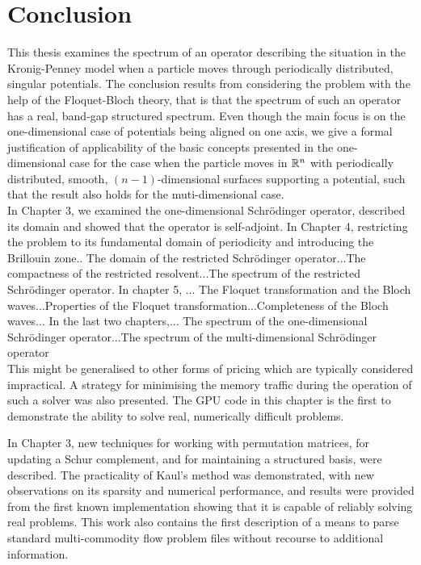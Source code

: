 \chapter{Conclusion} \label{chap:8}
	
This thesis examines the spectrum of an operator describing the situation in the Kronig-Penney model when a particle moves through periodically distributed, singular potentials. The conclusion results from considering the problem with the help of the Floquet-Bloch theory, that is that the spectrum of such an operator has a real, band-gap structured spectrum. Even though the main focus is on the one-dimensional case of potentials being aligned on one axis, we give a formal justification of applicability of the basic concepts presented in the one-dimensional case for the case when the particle moves in $\mathbb{R}^{n}$ with periodically distributed, smooth, $(n-1)$-dimensional surfaces supporting a potential, such that the result also holds for the muti-dimensional case.
~\\

In Chapter 3, we examined the one-dimensional Schrödinger operator, described its domain and showed that the operator is self-adjoint. In Chapter 4, restricting the problem to its fundamental domain of periodicity and introducing the Brillouin zone.. The domain of the restricted Schrödinger operator...The compactness of the restricted resolvent...The spectrum of the restricted Schrödinger operator. In chapter 5, ... The Floquet transformation and the Bloch waves...Properties of the Floquet transformation...Completeness of the Bloch waves... In the last two chapters,... The spectrum of the one-dimensional Schrödinger operator...The spectrum of the multi-dimensional Schrödinger operator 
~\\

This might be generalised to other forms of pricing which are typically considered impractical. A strategy for minimising the memory traffic during the operation of such a solver was also presented. The GPU code in this chapter is the first to demonstrate the ability to solve real, numerically difficult problems. 

In Chapter 3, new techniques for working with permutation matrices, for updating a Schur complement, and for maintaining a structured basis, were described. The practicality of Kaul’s method was demonstrated, with new observations on its sparsity and numerical performance, and results were provided from the first known implementation showing that it is capable of reliably solving real problems. This work also contains the first description of a means to parse standard multi-commodity flow problem files without recourse to additional information.


